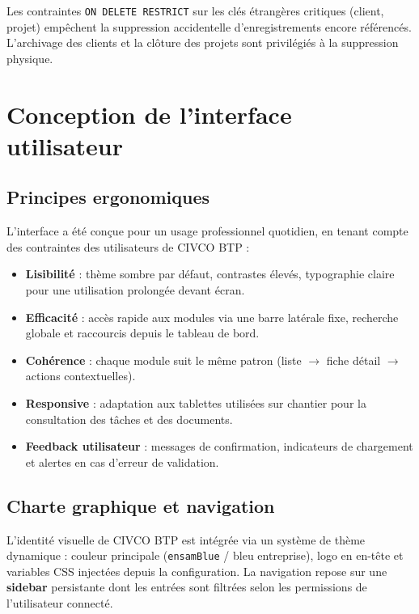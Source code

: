 Les contraintes \texttt{ON DELETE RESTRICT} sur les clés étrangères critiques
(client, projet) empêchent la suppression accidentelle d'enregistrements encore
référencés. L'archivage des clients et la clôture des projets sont privilégiés
à la suppression physique.

\section{Conception de l'interface utilisateur}

\subsection{Principes ergonomiques}

L'interface a été conçue pour un usage professionnel quotidien, en tenant compte
des contraintes des utilisateurs de CIVCO BTP :

\begin{itemize}
  \item \textbf{Lisibilité} : thème sombre par défaut, contrastes élevés, typographie
  claire pour une utilisation prolongée devant écran.
  \item \textbf{Efficacité} : accès rapide aux modules via une barre latérale fixe,
  recherche globale et raccourcis depuis le tableau de bord.
  \item \textbf{Cohérence} : chaque module suit le même patron (liste $\rightarrow$
  fiche détail $\rightarrow$ actions contextuelles).
  \item \textbf{Responsive} : adaptation aux tablettes utilisées sur chantier pour
  la consultation des tâches et des documents.
  \item \textbf{Feedback utilisateur} : messages de confirmation, indicateurs de
  chargement et alertes en cas d'erreur de validation.
\end{itemize}

\subsection{Charte graphique et navigation}

L'identité visuelle de CIVCO BTP est intégrée via un système de thème dynamique :
couleur principale (\texttt{ensamBlue} / bleu entreprise), logo en en-tête et
variables CSS injectées depuis la configuration. La navigation repose sur une
\textbf{sidebar} persistante dont les entrées sont filtrées selon les permissions
de l'utilisateur connecté.


